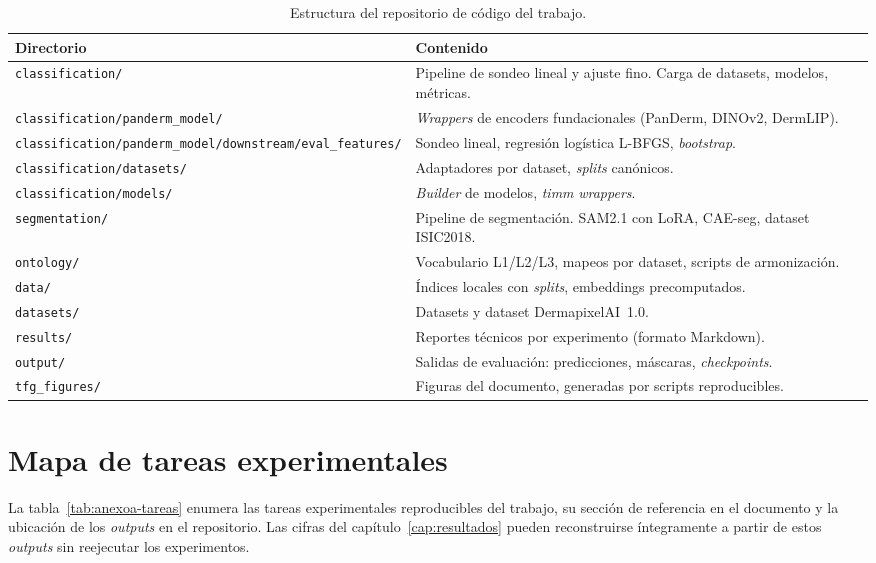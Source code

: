 \begin{table}[H]
\centering
\footnotesize
\setlength{\tabcolsep}{4pt}
\renewcommand{\arraystretch}{0.95}
\caption{Estructura del repositorio de código del trabajo.}
\label{tab:anexoa-repo}
\begin{tabular}{ll}
\hline
Directorio                       & Contenido \\
\hline
\texttt{classification/}         & Pipeline de sondeo lineal y ajuste fino. Carga de datasets, modelos, métricas. \\
\texttt{classification/panderm\_model/} & \emph{Wrappers} de encoders fundacionales (PanDerm, DINOv2, DermLIP). \\
\texttt{classification/panderm\_model/downstream/eval\_features/} & Sondeo lineal, regresión logística L-BFGS, \emph{bootstrap}. \\
\texttt{classification/datasets/}& Adaptadores por dataset, \emph{splits} canónicos. \\
\texttt{classification/models/}  & \emph{Builder} de modelos, \emph{timm} \emph{wrappers}. \\
\texttt{segmentation/}           & Pipeline de segmentación. SAM2.1 con LoRA, CAE-seg, dataset ISIC2018. \\
\texttt{ontology/}               & Vocabulario L1/L2/L3, mapeos por dataset, scripts de armonización. \\
\texttt{data/}                   & Índices locales con \emph{splits}, embeddings precomputados. \\
\texttt{datasets/}               & Datasets y dataset DermapixelAI~1.0. \\
\texttt{results/}                & Reportes técnicos por experimento (formato Markdown). \\
\texttt{output/}                 & Salidas de evaluación: predicciones, máscaras, \emph{checkpoints}. \\
\texttt{tfg\_figures/}           & Figuras del documento, generadas por scripts reproducibles. \\
\hline
\end{tabular}
\end{table}

\section{Mapa de tareas experimentales}
\label{sec:anexoa-tareas}

La tabla~\ref{tab:anexoa-tareas} enumera las tareas
experimentales reproducibles del trabajo, su sección de referencia
en el documento y la ubicación de los \emph{outputs} en el
repositorio. Las cifras del capítulo~\ref{cap:resultados} pueden
reconstruirse íntegramente a partir de estos \emph{outputs} sin
reejecutar los experimentos.

